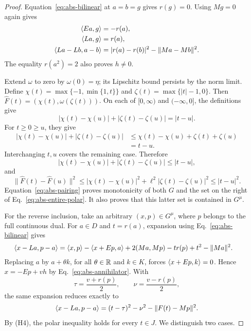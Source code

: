 \begin{proof}
Equation~\eqref{eq:abs-bilinear} at $a=b=g$ gives $r(g)=0$.
Using $Mg=0$ again gives
\begin{equation}
\begin{aligned}
\langle Ea,g\rangle&=-r(a),\\
\langle La,g\rangle&=r(a),\\
\langle La-Lb,a-b\rangle&=|r(a)-r(b)|^2-\|Ma-Mb\|^2.
\end{aligned}
\label{eq:abs-pairing}
\end{equation}
The equality $r(a^2)=2$ also proves $h\ne0$.

Extend $\omega$ to zero by $\omega(0)=\eta$; its Lipschitz bound
persists by the norm limit. Define
$\chi(t)=\max\{-1,\min\{1,t\}\}$ and
$\zeta(t)=\max\{|t|-1,0\}$. Then
$\widehat F(t)=(\chi(t),\omega(\zeta(t)))$.
On each of $[0,\infty)$ and $(-\infty,0]$, the definitions give
\[
|\chi(t)-\chi(u)|+|\zeta(t)-\zeta(u)|=|t-u|.
\]
For $t\ge0\ge u$, they give
\[
\begin{aligned}
|\chi(t)-\chi(u)|+|\zeta(t)-\zeta(u)|
&\le \chi(t)-\chi(u)+\zeta(t)+\zeta(u)\\
&=t-u.
\end{aligned}
\]
Interchanging $t,u$ covers the remaining case. Therefore
\[
|\chi(t)-\chi(u)|+|\zeta(t)-\zeta(u)|\le|t-u|,
\]
and
\[
\|\widehat F(t)-\widehat F(u)\|^2
\le|\chi(t)-\chi(u)|^2+\ell^2|\zeta(t)-\zeta(u)|^2
\le|t-u|^2.
\]
Equation~\eqref{eq:abs-pairing} proves monotonicity of both $G$
and the set on the right of Eq.~\eqref{eq:abs-entire-polar}.
It also proves that this latter set is contained in $G^\mu$.

For the reverse inclusion, take an arbitrary $(x,p)\in G^\mu$,
where $p$ belongs to the full continuous dual. For $a\in D$ and
$t=r(a)$, expansion using Eq.~\eqref{eq:abs-bilinear} gives
\begin{align*}
\langle x-La,p-a\rangle
={}&\langle x,p\rangle-\langle x+Ep,a\rangle
       +2(Ma,Mp)-t r(p)+t^2-\|Ma\|^2.
\end{align*}
Replacing $a$ by $a+\theta k$, for all $\theta\in\mathbb R$ and
$k\in K$, forces $\langle x+Ep,k\rangle=0$. Hence
$x=-Ep+v h$ by Eq.~\eqref{eq:abs-annihilator}. With
\[
\tau=\frac{v+r(p)}2,\qquad \nu=\frac{v-r(p)}2,
\]
the same expansion reduces exactly to
\begin{equation}
\langle x-La,p-a\rangle=(t-\tau)^2-\nu^2-\|F(t)-Mp\|^2.
\label{eq:abs-polar-square}
\end{equation}
By \textup{(H4)}, the polar inequality holds for every $t\in J$.
We distinguish two cases.


\end{proof}
